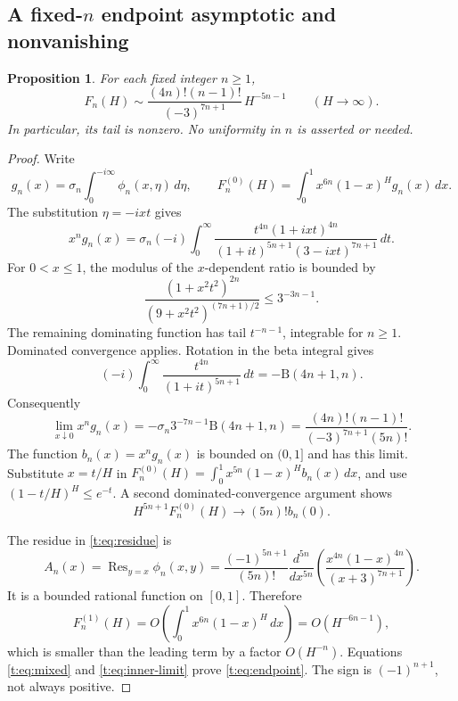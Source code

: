 \documentclass[11pt]{amsart}
\newcommand{\dd}{\,d}
\newcommand{\Res}{\operatorname{Res}}
\newcommand{\Bfun}{\mathrm B}
\theoremstyle{plain}
\newtheorem{proposition}[theorem]{Proposition}
\theoremstyle{remark}\newtheorem{remark}[theorem]{Remark}
\numberwithin{equation}{section}
\begin{document}
\subsection{A fixed-\texorpdfstring{$n$}{n} endpoint asymptotic and nonvanishing}
\begin{proposition}\label{t:prop:endpoint}
For each fixed integer $n\ge1$,
\begin{equation}\label{t:eq:endpoint}
 F_n(H)\sim\frac{(4n)!(n-1)!}{(-3)^{7n+1}}\,H^{-5n-1}
 \qquad(H\to\infty).
\end{equation}
In particular, its tail is nonzero. No uniformity in $n$ is asserted or
needed.
\end{proposition}
\begin{proof}
Write
\[
 g_n(x)=\sigma_n\int_0^{-i\infty}\phi_n(x,\eta)\dd\eta,
 \qquad F_n^{(0)}(H)=\int_0^1x^{6n}(1-x)^H g_n(x)\dd x.
\]
The substitution $\eta=-ixt$ gives
\begin{equation}\label{t:eq:scaled-inner}
 x^ng_n(x)=\sigma_n(-i)\int_0^\infty
 \frac{t^{4n}(1+ixt)^{4n}}
 {(1+it)^{5n+1}(3-ixt)^{7n+1}}\dd t.
\end{equation}
For $0<x\le1$, the modulus of the $x$-dependent ratio is bounded by
\[
 \frac{(1+x^2t^2)^{2n}}{(9+x^2t^2)^{(7n+1)/2}}
 \le3^{-3n-1}.
\]
The remaining dominating function has tail $t^{-n-1}$, integrable for
$n\ge1$. Dominated convergence applies. Rotation in the beta integral gives
\[
 (-i)\int_0^\infty\frac{t^{4n}}{(1+it)^{5n+1}}\dd t
 =-\Bfun(4n+1,n).
\]
Consequently
\begin{equation}\label{t:eq:inner-limit}
 \lim_{x\downarrow0}x^ng_n(x)
 =-\sigma_n3^{-7n-1}\Bfun(4n+1,n)
 =\frac{(4n)!(n-1)!}{(-3)^{7n+1}(5n)!}.
\end{equation}
The function $b_n(x)=x^ng_n(x)$ is bounded on $(0,1]$ and has this limit.
Substitute $x=t/H$ in
$F_n^{(0)}(H)=\int_0^1x^{5n}(1-x)^Hb_n(x)\dd x$, and use
$(1-t/H)^H\le e^{-t}$. A second dominated-convergence argument shows
\[
 H^{5n+1}F_n^{(0)}(H)\longrightarrow (5n)!b_n(0).
\]

The residue in \eqref{t:eq:residue} is
\[
 A_n(x)=\Res_{y=x}\phi_n(x,y)
 =\frac{(-1)^{5n+1}}{(5n)!}\frac{d^{5n}}{dx^{5n}}
 \left(\frac{x^{4n}(1-x)^{4n}}{(x+3)^{7n+1}}\right).
\]
It is a bounded rational function on $[0,1]$. Therefore
\[
 F_n^{(1)}(H)=O\left(\int_0^1x^{6n}(1-x)^H\dd x\right)
 =O(H^{-6n-1}),
\]
which is smaller than the leading term by a factor $O(H^{-n})$.
Equations \eqref{t:eq:mixed} and \eqref{t:eq:inner-limit} prove
\eqref{t:eq:endpoint}. The sign is $(-1)^{n+1}$, not always positive.
\end{proof}
\end{document}
